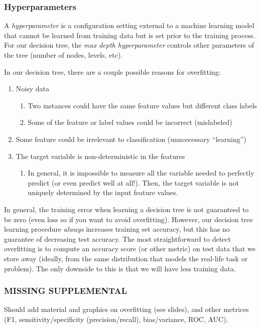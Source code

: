 \documentclass[11 pt]{scrartcl}
\begin{document}
\subsubsection{Hyperparameters}
\begin{definition}
A \emph{hyperparameter} is a configuration setting external to a machine learning model that cannot be learned from training data but is set prior to the training process. For our decision tree, the \emph{max depth hyperparameter} controls other parameters of the tree (number of nodes, levels, etc).
\end{definition}
In our decision tree, there are a couple possible reasons for overfitting:
\begin{enumerate}
  \item Noisy data
    \begin{enumerate}
      \item Two instances could have the same feature values but different class labels
      \item Some of the feature or label values could be incorrect (mislabeled)
    \end{enumerate}
  \item Some feature could be irrelevant to classification (unncecessary ``learning'')
  \item The target variable is non-deterministic in the features
    \begin{enumerate}
      \item In general, it is impossible to measure all the variable needed to perfectly predict (or even predict well at all!). Then, the target variable is not uniquely determined by the input feature values.
    \end{enumerate}
\end{enumerate}
In general, the training error when learning a decision tree is not guaranteed to be zero (even loss so if you want to avoid overfitting). However, our decision tree learning procedure \textit{always} increases training set accuracy, but this has no guarantee of decreasing test accuracy. The most straightforward to detect overfitting is to compute an accuracy score (or other metric) on test data that we store away (ideally, from the same distribution that models the real-life task or problem). The only downside to this is that we will have less training data. 
\subsubsection{MISSING SUPPLEMENTAL}
Should add material and graphics on overfitting (see slides), and other metrices (F1, sensitivity/specificity (precision/recall), bias/variance, ROC, AUC). 
\end{document}
